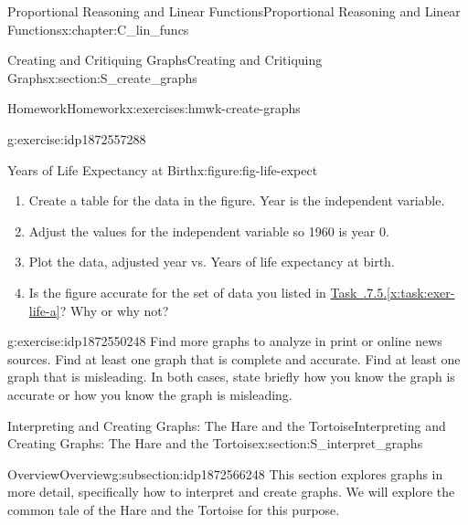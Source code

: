 \documentclass[oneside,10pt,]{book}
\newcommand{\xreffont}{\relax}
\numberwithin{equation}{chapter}
\begin{document}
\begin{chapterptx}{Proportional Reasoning and Linear Functions}{}{Proportional Reasoning and Linear Functions}{}{}{x:chapter:C_lin_funcs}
\begin{sectionptx}{Creating and Critiquing Graphs}{}{Creating and Critiquing Graphs}{}{}{x:section:S_create_graphs}
\begin{exercises-subsection}{Homework}{}{Homework}{}{}{x:exercises:hmwk-create-graphs}
\begin{divisionexercise}{5}{}{}{g:exercise:idp1872557288}
\begin{figureptx}{Years of Life Expectancy at Birth}{x:figure:fig-life-expect}{}
\begin{image}{0.25}{0.5}{0.25}
\end{image}%
\tcblower
\end{figureptx}%
\begin{enumerate}[font=\bfseries,label=(\alph*),ref=\alph*]
\item\label{x:task:exer-life-a}Create a table for the data in the figure. Year is the independent variable.%
\item{}Adjust the values for the independent variable so 1960 is year 0.%
\item{}Plot the data, adjusted year vs. Years of life expectancy at birth.%
\item{}Is the figure accurate for the set of data you listed in \hyperref[x:task:exer-life-a]{Task~{\xreffont 2.2.7.5}.{\xreffont\ref{x:task:exer-life-a}}}? Why or why not?%
\end{enumerate}
\end{divisionexercise}%
\begin{divisionexercise}{6}{}{}{g:exercise:idp1872550248}%
Find more graphs to analyze in print or online news sources. Find at least one graph that is complete and accurate. Find at least one graph that is misleading. In both cases, state briefly how you know the graph is accurate or how you know the graph is misleading.%
\end{divisionexercise}%
\end{exercises-subsection}
\end{sectionptx}
%
%
\typeout{************************************************}
\typeout{************************************************}
%
\begin{sectionptx}{Interpreting and Creating Graphs: The Hare and the Tortoise}{}{Interpreting and Creating Graphs: The Hare and the Tortoise}{}{}{x:section:S_interpret_graphs}
%
%
\typeout{************************************************}
\typeout{************************************************}
%
\begin{subsectionptx}{Overview}{}{Overview}{}{}{g:subsection:idp1872566248}
This section explores graphs in more detail, specifically how to interpret and create graphs. We will explore the common tale of the Hare and the Tortoise for this purpose.%
\end{subsectionptx}
%
%
\typeout{************************************************}
\typeout{************************************************}
%

\end{sectionptx}
\end{chapterptx}
\end{document}

